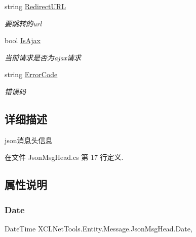 \begin{DoxyCompactItemize}
string \hyperlink{class_x_c_l_net_tools_1_1_entity_1_1_message_1_1_json_msg_head_aa3e8eb7bf16a7a3abea7e7797488685e}{Redirect\+U\+RL}
\begin{DoxyCompactList}\small\item\em 要跳转的url \end{DoxyCompactList}\item 
bool \hyperlink{class_x_c_l_net_tools_1_1_entity_1_1_message_1_1_json_msg_head_adedb9cb59037071c879572360cebc574}{Is\+Ajax}
\begin{DoxyCompactList}\small\item\em 当前请求是否为ajax请求 \end{DoxyCompactList}\item 
string \hyperlink{class_x_c_l_net_tools_1_1_entity_1_1_message_1_1_json_msg_head_a0f5effef61535ac1a2560f9c47eaea17}{Error\+Code}
\begin{DoxyCompactList}\small\item\em 错误码 \end{DoxyCompactList}\end{DoxyCompactItemize}


\subsection{详细描述}
json消息头信息 



在文件 Json\+Msg\+Head.\+cs 第 17 行定义.



\subsection{属性说明}
\mbox{\label{class_x_c_l_net_tools_1_1_entity_1_1_message_1_1_json_msg_head_ae57b40b25eb4db28d428134d33358c90}} 
\subsubsection{\texorpdfstring{Date}{Date}}
{\footnotesize\ttfamily Date\+Time X\+C\+L\+Net\+Tools.\+Entity.\+Message.\+Json\+Msg\+Head.\+Date\hspace{0.3cm}{\ttfamily [get]}, {\ttfamily [set]}}



